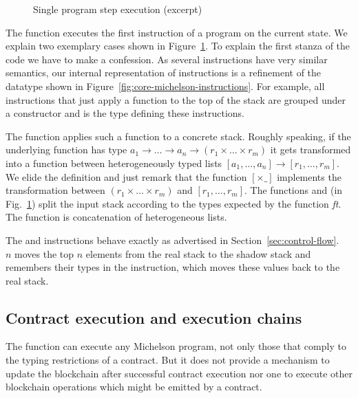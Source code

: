 \begin{figure}[tp]
  \Concretepsfct
  \ConcretepsDIP
  \caption{Single program step execution (excerpt)}
  \label{fig:prog-step-example}
\end{figure}
The function  executes the first instruction of a
program on the current state.
We explain two exemplary cases shown in
Figure~\ref{fig:prog-step-example}.  To explain the first stanza of
the code we have to make a
confession. As several instructions have very similar semantics, our
internal representation of instructions is a refinement of the
datatype shown in Figure~\ref{fig:core-michelson-instructions}. For
example, all instructions that just apply a function to the top of the
stack are grouped under a constructor  and 
is the type defining these instructions.
\FunctionsInstructionfct

The function  applies such a function to a concrete
stack. Roughly speaking, if the underlying function has type $a_1 \to \dots \to a_n \to
(r_1 \times \dots \times r_m)$ it gets transformed into a function
between heterogeneously typed lists
$[a_1, \dots, a_n] \to [r_1, \dots, r_m]$. We elide the definition and
just remark that the function $[{\times}\_]$ implements the
transformation between $(r_1 \times \dots \times r_m)$ and $[r_1,
\dots, r_m]$. The functions  and  (in Fig.~\ref{fig:prog-step-example}) split the
input stack according to the types expected by the function \textit{ft}. The
function  is concatenation of heterogeneous lists.

The  and  instructions behave exactly as
advertised in Section~\ref{sec:control-flow}. ~$n$ moves the
top $n$ elements from the real stack to the shadow stack and remembers
their types in the  instruction, which moves these values
back to the real stack.



\subsection{Contract execution and execution chains}\label{sec:contract-execution}

The  function can execute any Michelson program, not only those that comply
to the typing restrictions of a contract.
But it does not provide a mechanism to update the blockchain after successful contract execution
nor one to execute other blockchain operations which might be emitted by a contract.

